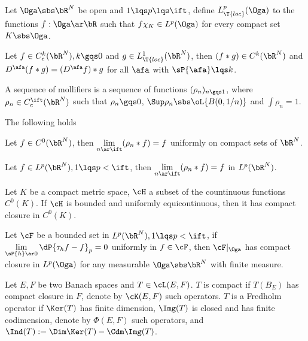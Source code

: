 \documentclass[a4paper, twoside]{article}
\begin{document}
\begin{dfn}
    Let $\Oga\sbs\bR^{N}$ be open and $1\lqs p\lqs \ift$, define $L_{\T{loc}}^{p}(\Oga)$ to the functions $f:\Oga\ar\bR$ such that $f\chi_{K}\in L^{p}(\Oga)$ for every compact set $K\sbs\Oga$.
\end{dfn}

\begin{thm}[Proposition~4.20]
    Let $f\in C_{c}^{k}(\bR^{N}), k\gqs0$ and $g\in L_{\T{loc}}^{1}(\bR^{N})$, then $(f\ast g)\in C^{k}(\bR^{N})$ and $D^{\afa}(f\ast g)=(D^{\afa}f)\ast g$ for all $\afa$ with $\sP{\afa}\lqs k$.
\end{thm}


\begin{dfn}
    A sequence of mollifiers is a sequence of functions $(\rho_{n})_{n\gqs1}$, where $\rho_{n}\in C_{c}^{\ift}(\bR^{N})$ such that $\rho_{n}\gqs0$, $\Sup\rho_{n}\sbs\oL{B(0,1/n)}$ and $\int\rho_{n}=1$.
\end{dfn}

\begin{thm}
    The following holds
    \begin{itm}
        \item Let $f\in C^{0}(\bR^{N})$, then $\lim\limits_{n\ar\ift}(\rho_{n}\ast f)=f$ uniformly on compact sets of $\bR^{N}$.
        \item Let $f\in L^{p}(\bR^{N}), 1\lqs p<\ift$, then $\lim\limits_{n\ar\ift}(\rho_{n}\ast f)=f$ in $L^{p}(\bR^{N})$.
    \end{itm}
\end{thm}


\begin{thm}
    Let $K$ be a compact metric space, $\cH$ a subset of the countinuous functions $C^{0}(K)$. If $\cH$ is bounded and uniformly equicontinuous, then it has compact closure in $C^{0}(K)$.
\end{thm}


\begin{thm}
    Let $\cF$ be a bounded set in $L^{p}(\bR^{N}),1\lqs p<\ift$, if $\lim\limits_{\sP{h}\ar0}\dP{\tau_{h}f-f}_{p}=0$ uniformly in $f\in \cF$, then $\cF|_{\Oga}$ has compact closure in $L^{p}(\Oga)$ for any measurable $\Oga\sbs\bR^{N}$ with finite measure.
\end{thm}

\begin{dfn}
    Let $E,F$ be two Banach spaces and $T\in\cL(E,F)$. $T$ is compact if $T(B_{E})$ has compact closure in $F$, denote by $\cK(E,F)$ such operators. $T$ is a Fredholm operator if $\Ker(T)$ has finite dimension, $\Img(T)$ is closed and has finite codimension, denote by $\Phi(E,F)$ such operators, and $\Ind(T):=\Dim\Ker(T)-\Cdm\Img(T)$.
\end{dfn}
\end{document}
